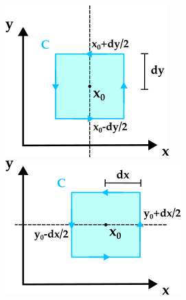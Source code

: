  
\begin{figure}[!ht]
    \begin{minipage}{0.4\textwidth}
        \centering
        \includegraphics[width=\linewidth]{images/rotar}
    \end{minipage}
   \hspace{2cm}
    \begin{minipage}{0.4\textwidth}
        \centering
        \includegraphics[width=\linewidth]{images/rotar1}
    \end{minipage}
\end{figure}
